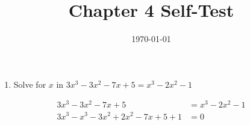 \documentclass[11pt]{article}
\date{\today}
\title{Chapter 4 Self-Test}
\begin{document}
\maketitle
\begin{enumerate}
\item Solve for \(x\) in \(3x^3-3x^2-7x+5=x^3-2x^2-1\)
\end{enumerate}

\begin{align*}
3x^3-3x^2-7x+5&=x^3-2x^2-1\\
3x^3-x^3-3x^2+2x^2-7x+5+1&=0\\

\end{align*}
\end{document}
